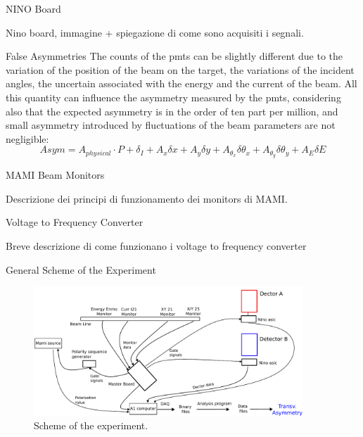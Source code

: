 \documentclass[9pt,a4paper]{beamer}
\begin{document}
\begin{frame}{NINO Board}

Nino board, immagine + spiegazione di come sono acquisiti i segnali.

\end{frame}

\begin{frame}{False Asymmetries}
The counts of the pmts can be slightly different due to the variation of the position of the beam on the target, the variations of the incident angles, the uncertain associated with the energy and the current of the beam. All this quantity can influence the asymmetry measured by the pmts, considering also that the expected asymmetry is in the order of ten part per million, and small asymmetry introduced by fluctuations of the beam parameters are not negligible:
\newline
\newline
\begin{equation}
Asym = A_{physical} \cdot P + \delta_{I} + A_{x} \delta x + A_{y} \delta y + A_{\theta_{x}} \delta \theta_{x} + A_{\theta_{y}} \delta \theta_{y}+ A_{E} \delta E 
\end{equation}
\end{frame}


\begin{frame}{MAMI Beam Monitors}

Descrizione dei principi di funzionamento dei monitors di MAMI.

\end{frame}


\begin{frame}{Voltage to Frequency Converter}

Breve descrizione di come funzionano i voltage to frequency converter

\end{frame}

\begin{frame}{General Scheme of the Experiment}

\begin{figure}[hbtp]
\centering
\includegraphics[width = 0.9\textwidth]{figures/Electronic_scheme.pdf}
\caption{Scheme of the experiment.}
\end{figure}
\end{frame}
\end{document}
